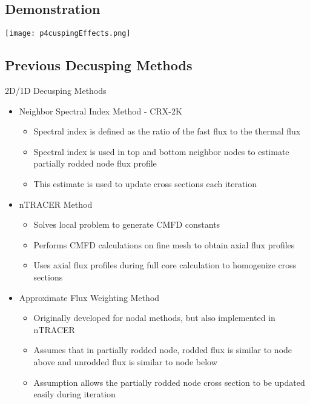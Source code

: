 \subsection{Demonstration}
\begin{frame}
    
\begin{center}
    \texttt{[image: p4cuspingEffects.png]}
\end{center}
\vfill
    
\end{frame}


\subsection{Previous Decusping Methods}
\begin{frame}[t]{2D/1D Decusping Methods}

\begin{itemize}
\item Neighbor Spectral Index Method - CRX-2K 
\cite{cho2015CRX2d1dFusionDecusping}
\begin{itemize}
    \item Spectral index is defined as the ratio of the fast flux to the 
    thermal flux
    \item Spectral index is used in top and bottom neighbor nodes to 
    estimate partially rodded node flux profile
    \item This estimate is used to update cross sections 
    each iteration
\end{itemize}
\item nTRACER Method \cite{ICAPPcontrolRodDecuspingNTRACER}
\begin{itemize}
    \item Solves local problem to generate CMFD constants
    \item Performs CMFD calculations on fine mesh to obtain axial flux 
    profiles
    \item Uses axial flux profiles during full core calculation to 
    homogenize cross sections
\end{itemize}
\item Approximate Flux Weighting Method \cite{gehinThesis1992quasi}
\begin{itemize}
    \item Originally developed for nodal methods, but also implemented in nTRACER \cite{Ryu2017nTRACERWholeCoreTransportSolutionstoC5G7-TDBenchmark}
    \item Assumes that in partially rodded node, rodded flux is similar to node above and unrodded flux is similar to node below
    \item Assumption allows the partially rodded node cross section to be updated easily during iteration
\end{itemize}
\end{itemize}

\end{frame}

